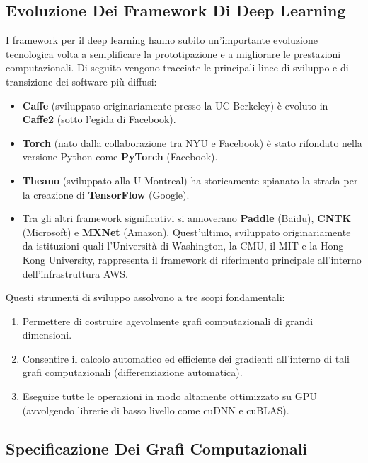 ﻿\documentclass[11pt, a4paper]{article}
\begin{document}
\subsection{Evoluzione Dei Framework Di Deep Learning}

I framework per il deep learning hanno subito un'importante evoluzione tecnologica volta a semplificare la prototipazione e a migliorare le prestazioni computazionali. Di seguito vengono tracciate le principali linee di sviluppo e di transizione dei software più diffusi:


\begin{itemize}
    \item \textbf{Caffe} (sviluppato originariamente presso la UC Berkeley) è evoluto in \textbf{Caffe2} (sotto l'egida di Facebook).
    \item \textbf{Torch} (nato dalla collaborazione tra NYU e Facebook) è stato rifondato nella versione Python come \textbf{PyTorch} (Facebook).
    \item \textbf{Theano} (sviluppato alla U Montreal) ha storicamente spianato la strada per la creazione di \textbf{TensorFlow} (Google).
    \item Tra gli altri framework significativi si annoverano \textbf{Paddle} (Baidu), \textbf{CNTK} (Microsoft) e \textbf{MXNet} (Amazon). Quest'ultimo, sviluppato originariamente da istituzioni quali l'Università di Washington, la CMU, il MIT e la Hong Kong University, rappresenta il framework di riferimento principale all'interno dell'infrastruttura AWS.
\end{itemize}

Questi strumenti di sviluppo assolvono a tre scopi fondamentali:
\begin{enumerate}
    \item Permettere di costruire agevolmente grafi computazionali di grandi dimensioni.
    \item Consentire il calcolo automatico ed efficiente dei gradienti all'interno di tali grafi computazionali (differenziazione automatica).
    \item Eseguire tutte le operazioni in modo altamente ottimizzato su GPU (avvolgendo librerie di basso livello come cuDNN e cuBLAS).
\end{enumerate}

\subsection{Specificazione Dei Grafi Computazionali}
\end{document}
